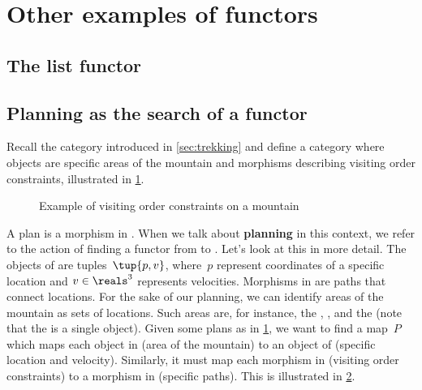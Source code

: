 \section{Other examples of functors}

\subsection{The list functor}


\subsection{Planning as the search of a functor}
\begin{example}
  Recall the category \Berg introduced in \cref{sec:trekking} and define a category \Plans where objects are specific areas of the mountain and morphisms describing visiting order constraints, illustrated in \cref{fig:visiting_order_constraints}.


  \begin{figure}[h]
    \begin{center}
    \end{center}
    \caption{Example of visiting order constraints on a mountain}
    \label{fig:visiting_order_constraints}
  \end{figure}
  A plan is a morphism in \Plans. When we talk about \textbf{planning} in this context, we refer to the action of finding a functor from \Plans to \Berg. Let's look at this in more detail. The objects of \Berg are tuples~$\tup{p,v}$, where~$p$ represent coordinates of a specific location and $v\in \reals^3$ represents velocities. Morphisms in \Berg are paths that connect locations. For the sake of our planning, we can identify areas of the mountain as sets of locations. Such areas are, for instance, the , , and the  (note that the  is a single object). Given some plans as in \cref{fig:visiting_order_constraints}, we want to find a map~$P$ which maps each object in \Plans (area of the mountain) to an object of \Berg (specific location and velocity). Similarly, it must map each morphism in \Plans (visiting order constraints) to a morphism in \Berg (specific paths). This is illustrated in \cref{fig:plans_functor}.
\end{example}

\begin{figure}
  \centering
  \caption{}
  \label{fig:plans_functor}
\end{figure}

